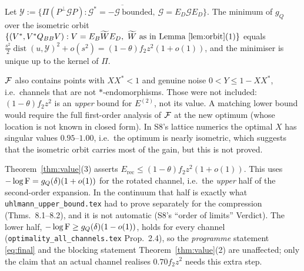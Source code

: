 \documentclass[11pt]{article}
\newcommand{\Erecc}{E_{\mathrm{rec}}}
\begin{document}
\begin{proposition}\label{prop:orbval}
Let $\mathcal Y:=\overline{\{\Pi(P^\perp\mathcal GP):\mathcal G^*=-\mathcal G\ \text{bounded},\ \mathcal G=E_D\mathcal GE_D\}}$.
The minimum of $g_Q$ over the isometric orbit
$\{(V^*,V^*Q_{BB}V):V=E_B\widetilde WE_D,\ \widetilde W\ \text{as in Lemma~\ref{lem:orbit}(1)}\}$
equals $\frac{s^2}{2}\operatorname{dist}(u,\mathcal Y)^2+o(s^2)=(1-\theta)f_2z^2(1+o(1))$,
and the minimiser is unique up to the kernel of $\Pi$.
\end{proposition}

\begin{verdictgap}
$\mathcal F$ also contains points with $XX^*<1$ and genuine noise $0<Y\le1-XX^*$, i.e.\
channels that are not $*$-endomorphisms.  Those were not included: $(1-\theta)f_2z^2$ is
an \emph{upper} bound for $E^{(2)}$, not its value.  A matching lower bound would
require the full first-order analysis of $\mathcal F$ at the new optimum (whose location is not
known in closed form).  In S8's lattice numerics the optimal $X$ has singular values
$0.95$--$1.00$, i.e.\ the optimum is nearly isometric, which suggests that the isometric
orbit carries most of the gain, but this is not proved.
\end{verdictgap}

\begin{verdictgap}[\;From $g_Q$ back to $-\log\Fid$ for the rotated channel]
Theorem~\ref{thm:value}(3) asserts $\Erecc\le(1-\theta)f_2z^2(1+o(1))$.  This uses
$-\log\operatorname{F}=g_Q(\delta)(1+o(1))$ for the rotated channel, i.e.\ the \emph{upper} half of
the second-order expansion.  In the continuum that half is exactly what
\texttt{uhlmann\_upper\_bound.tex} had to prove separately for the compression
(Thms.~8.1--8.2), and it is not automatic (S8's ``order of limits'' Verdict).  The
lower half, $-\log\operatorname{F}\ge g_Q(\delta)(1-o(1))$, holds for every channel
(\texttt{optimality\_all\_channels.tex} Prop.~2.4), so the \emph{programme} statement
\eqref{eq:final} and the blocking statement Theorem~\ref{thm:value}(2) are unaffected;
only the claim that an actual channel realises $0.70f_2z^2$ needs this extra step.
\end{verdictgap}
\end{document}
